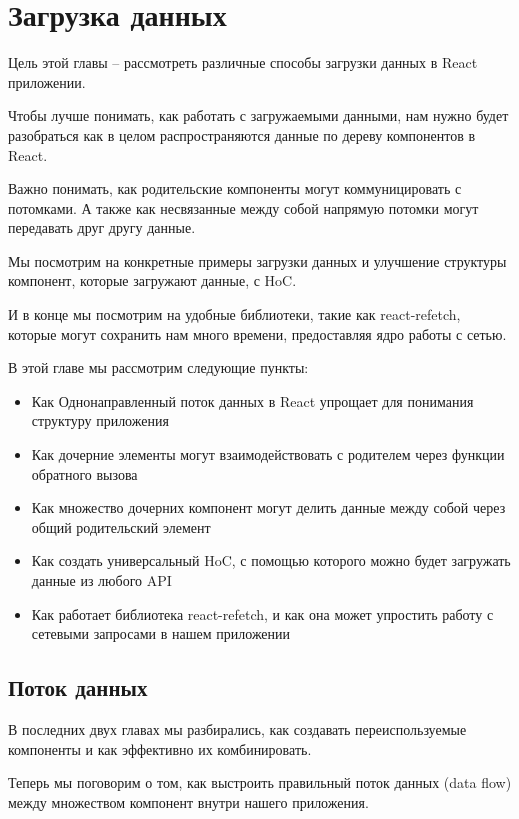 \chapter{Загрузка данных}

Цель этой главы -- рассмотреть различные способы загрузки данных в React приложении.

Чтобы лучше понимать, как работать с загружаемыми данными, нам нужно будет разобраться как в целом распространяются данные по дереву компонентов в React.

Важно понимать, как родительские компоненты могут коммуницировать с потомками. А также как несвязанные между собой напрямую потомки могут передавать друг другу данные.

Мы посмотрим на конкретные примеры загрузки данных и улучшение структуры компонент, которые загружают данные, с HoC.

И в конце мы посмотрим на удобные библиотеки, такие как  react-refetch, которые могут сохранить нам много времени, предоставляя ядро работы с сетью.

В этой главе мы рассмотрим следующие пункты:

\begin{itemize}
  \item Как Однонаправленный поток данных в React упрощает для понимания структуру приложения
  \item Как дочерние элементы могут взаимодействовать с родителем через функции обратного вызова
  \item Как множество дочерних компонент могут делить данные между собой через общий родительский элемент
  \item Как создать универсальный HoC, с помощью которого можно будет загружать данные из любого API
  \item Как работает библиотека react-refetch, и как она может упростить работу с сетевыми запросами в нашем приложении
\end{itemize}


\section{Поток данных}

В последних двух главах мы разбирались, как создавать переиспользуемые компоненты и как эффективно их комбинировать.

Теперь мы поговорим о том, как выстроить правильный поток данных (data flow) между множеством компонент внутри нашего приложения.

